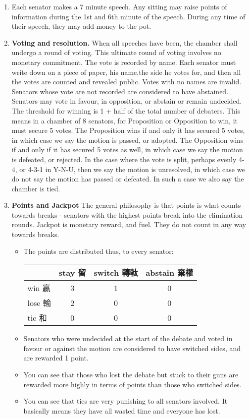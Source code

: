 \begin{enumerate}
    \item Each senator makes a 7 minute speech. Any sitting may raise points of information during the 1st and 6th minute of the speech. During any time of their speech, they may add money to the pot.
    \item \textbf{Voting and resolution.} When all speeches have been, the chamber shall undergo a round of voting. This ultimate round of voting involves no monetary commitment. The vote is recorded by name. Each senator must write down on a piece of paper, his name,the side he votes for, and then all the votes are counted and revealed public. Votes with no names are invalid. Senators whose vote are not recorded are considered to have abstained. Senators may vote in favour, in opposition, or abstain or remain undecided. The threshold for winning is 1 + half of the total number of debaters. This means in a chamber of 8 senators, for Proposition or Opposition to win, it must secure 5 votes. The Proposition wins if and only it has secured 5 votes, in which case we say the motion is passed, or adopted. The Opposition wins if and only if it has secured 5 votes as well, in which case we say the motion is defeated, or rejected. In the case where the vote is split, perhaps evenly 4-4, or 4-3-1 in Y-N-U, then we say the motion is unresolved, in which case we do not say the motion has passed or defeated. In such a case we also say the chamber is tied.

    \item \textbf{Points and Jackpot} The general philosophy is that points is what counts towards breaks - senators with the highest points break into the elimination rounds. Jackpot is monetary reward, and fuel. They do not count in any way towards breaks. 
    \begin{itemize}
        \item The points are distributed thus, to every senator:
        \begin{table}[h]
            \centering
            \begin{tabular}{l|ccc}
            \toprule
             & stay 留 & switch 轉軚 & abstain 棄權 \\
            \midrule
            win 贏 & 3 & 1 & 0 \\
            lose 輸 & 2 & 0 & 0 \\
            tie 和 & 0 & 0 & 0 \\
            \bottomrule
            \end{tabular}
        \end{table}
        \item Senators who were undecided at the start of the debate and voted in favour or against the motion are considered to have switched sides, and are rewarded 1 point.
        \item You can see that those who lost the debate but stuck to their guns are rewarded more highly in terms of points than those who switched sides. 
        \item You can see that ties are very punishing to all senators involved. It basically means they have all wasted time and everyone has lost. 
    \end{itemize}


\end{enumerate}
